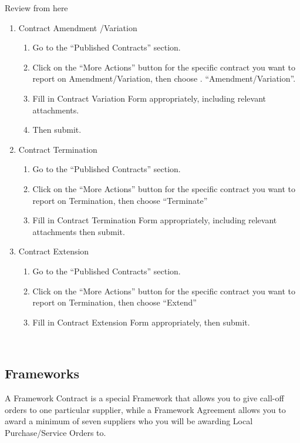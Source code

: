 \documentclass [12pt]{book}
\begin{document}
\begin{enumerate}
\begin{enumerate}
Review from here
\begin{enumerate}

\item Contract Amendment /Variation\\
\begin{enumerate}
    \item Go to the “Published Contracts” section.
    \item Click on the “More Actions” button for the specific contract you want to report on Amendment/Variation, then choose .
    “Amendment/Variation”.
    \item Fill in Contract Variation Form appropriately, including relevant attachments.
    \item Then submit.
\end{enumerate}


\item Contract Termination
\begin{enumerate}
    \item	Go to the “Published Contracts” section.
    \item	Click on the “More Actions” button for the specific contract you want to report on Termination, then choose “Terminate”
    \item	Fill in Contract Termination Form appropriately, including relevant attachments then submit.
\end{enumerate}

\item Contract Extension
\begin{enumerate}
    \item	Go to the “Published Contracts” section.
    \item	Click on the “More Actions” button for the specific contract you want to report on Termination, then choose “Extend”
    \item	Fill in Contract Extension Form appropriately, then submit.
 \end{enumerate}
 \end{enumerate}

\pagebreak

\subsection{Frameworks}
A Framework Contract is a special Framework that allows you to give call-off orders to one particular supplier, while a Framework Agreement allows you to award a minimum of seven suppliers who you will be awarding Local Purchase/Service Orders to.\\


\end{enumerate}
\end{enumerate}
\end{document}
